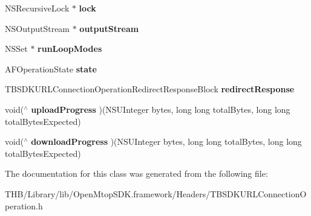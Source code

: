 \begin{DoxyCompactItemize}
N\+S\+Recursive\+Lock $\ast$ {\bfseries lock}
\item 
\mbox{\label{interface_t_b_s_d_k_u_r_l_connection_operation_ad4cea3e10b7f8ead62ebf84ae62008b9}} 
N\+S\+Output\+Stream $\ast$ {\bfseries output\+Stream}
\item 
\mbox{\label{interface_t_b_s_d_k_u_r_l_connection_operation_a5e629f35d600b9f48f525094e3f35903}} 
N\+S\+Set $\ast$ {\bfseries run\+Loop\+Modes}
\item 
\mbox{\label{interface_t_b_s_d_k_u_r_l_connection_operation_a6c52c38d6abf99de7d00b9a05cea14a2}} 
A\+F\+Operation\+State {\bfseries state}
\item 
\mbox{\label{interface_t_b_s_d_k_u_r_l_connection_operation_a67526b8bc785802ea59e211c4b3cd3ff}} 
T\+B\+S\+D\+K\+U\+R\+L\+Connection\+Operation\+Redirect\+Response\+Block {\bfseries redirect\+Response}
\item 
\mbox{\label{interface_t_b_s_d_k_u_r_l_connection_operation_aa2d1de95af3df59c7d008d4518529e71}} 
void($^\wedge$ {\bfseries upload\+Progress} )(N\+S\+U\+Integer bytes, long long total\+Bytes, long long total\+Bytes\+Expected)
\item 
\mbox{\label{interface_t_b_s_d_k_u_r_l_connection_operation_a43c24d4fa6b7c642b5ed83abb2f2b9ce}} 
void($^\wedge$ {\bfseries download\+Progress} )(N\+S\+U\+Integer bytes, long long total\+Bytes, long long total\+Bytes\+Expected)
\end{DoxyCompactItemize}


The documentation for this class was generated from the following file\+:\begin{DoxyCompactItemize}
\item 
T\+H\+B/\+Library/lib/\+Open\+Mtop\+S\+D\+K.\+framework/\+Headers/T\+B\+S\+D\+K\+U\+R\+L\+Connection\+Operation.\+h\end{DoxyCompactItemize}
